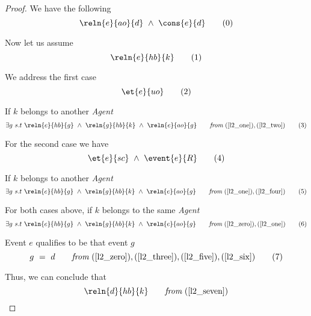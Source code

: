  \begin{proof}
        
        We have the following
        \[
            \reln{e}{ao}{d} \ \wedge \ \cons{e}{d} 
            \tag{0}
            \label{l2_zero}
        \]
        
        Now let us assume
        \[
            \reln{e}{hb}{k} 
            \tag{1}
            \label{l2_one}
        \]
        
        We address the first case
        \[
            \et{e}{uo} 
            \tag{2}
            \label{l2_two}
        \]
        
        \hspace{15pt} If $k$ belongs to another \textit{Agent}
        \[
            \exists g \ s.t \ 
            \reln{e}{hb}{g} \ \wedge \ \reln{g}{hb}{k} \ \wedge \ \reln{e}{ao}{g} \qquad
            \textit{from} \
            (\ref{l2_one}), 
            (\ref{l2_two}) 
            \tag{3}
            \label{l2_three}
        \]
        
         For the second case we have 
        \[
            \et{e}{sc} \ \wedge \ \event{e}{R}
            \tag{4}
            \label{l2_four}
        \]

        \hspace{15pt} If $k$ belongs to another \textit{Agent}
        \[
            \exists g \ s.t \ 
            \reln{e}{hb}{g} \ \wedge \ \reln{g}{hb}{k} \ \wedge \ \reln{e}{ao}{g} \qquad
            \textit{from} \
            (\ref{l2_one}), 
            (\ref{l2_four}) 
            \tag{5}
            \label{l2_five}
        \]
        
        For both cases above, if $k$ belongs to the same \textit{Agent}
        \[
            \exists g \ s.t \ 
            \reln{e}{hb}{g} \ \wedge \ \reln{g}{hb}{k} \ \wedge \ \reln{e}{ao}{g} \qquad
            \textit{from} \
            (\ref{l2_zero}), 
            (\ref{l2_one})
            \tag{6}
            \label{l2_six}
        \]
    
        Event $e$ qualifies to be that event $g$
        \[
            g \ = \ d \qquad 
            \textit{from} \
            (\ref{l2_zero}), 
            (\ref{l2_three}), 
            (\ref{l2_five}),
            (\ref{l2_six})
            \tag{7}
            \label{l2_seven}
        \]
        
        Thus, we can conclude that
        \[
            \reln{d}{hb}{k} \qquad
            \textit{from} \ 
            (\ref{l2_seven})
        \]
        
    \end{proof}


